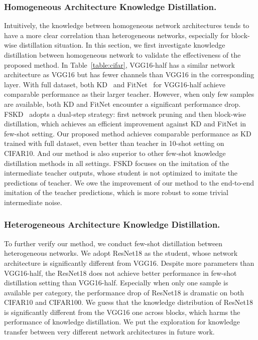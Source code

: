 \documentclass[letterpaper]{article} %
\begin{document}
{{{        \subsubsection{Homogeneous Architecture Knowledge Distillation.}
        Intuitively, the knowledge between homogeneous network architectures tends to have a more clear correlation than heterogeneous networks, especially for block-wise distillation situation. 
        In this section, we first investigate knowledge distillation between homogeneous network to validate the effectiveness of the proposed method.
        In Table~\ref{table:cifar}, VGG16-half has a similar network architecture as VGG16 but has fewer channels than VGG16 in the corresponding layer.
        With full dataset, both KD~\cite{hinton2015distilling} and FitNet~\cite{romero2015fitnets} for VGG16-half achieve comparable performance as their larger teacher.
        However, when only few samples are available, both KD and FitNet encounter a significant performance drop.
        FSKD~\cite{li2018few} adopts a dual-step strategy: first network pruning and then block-wise distillation, which achieves an efficient improvement against KD and FitNet in few-shot setting.
        Our proposed method achieves comparable performance as KD trained with full dataset, even better than teacher in 10-shot setting on CIFAR10.
        And our method is also superior to other few-shot knowledge distillation methods in all settings.
        FSKD focuses on the imitation of the intermediate teacher outputs, whose student is not optimized to imitate the predictions of teacher.
        We owe the improvement of our method to the end-to-end imitation of the teacher predictions, which is more robust to some trivial intermediate noise.


        \subsubsection{Heterogeneous Architecture Knowledge Distillation.}
        To further verify our method, we conduct few-shot distillation between heterogeneous networks. 
        We adopt ResNet18 as the student, whose network architecture is significantly different from VGG16.
        Despite more parameters than VGG16-half, the ResNet18 does not achieve better performance in few-shot distillation setting than VGG16-half. 
        Especially when only one sample is available per category, the performance drop of ResNet18 is dramatic on both CIFAR10 and CIFAR100. 
        We guess that the knowledge distribution of ResNet18 is significantly different from the VGG16 one across blocks, which harms the performance of knowledge distillation. 
        We put the exploration for knowledge transfer between very different network architectures in future work.

}}}
\end{document}
